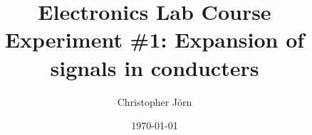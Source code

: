\title{Electronics Lab Course\\ Experiment \#1: Expansion of signals in conducters}
\author{Christopher J\"orn}
\date{\today}